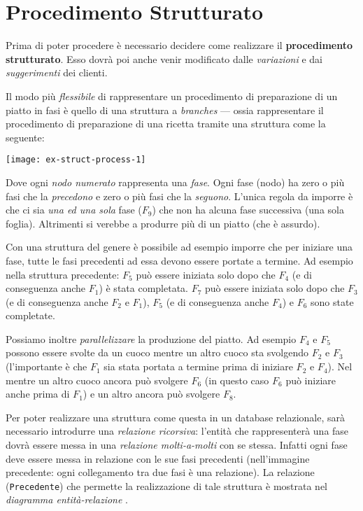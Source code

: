 \section{Procedimento Strutturato}\label{sec:structuredprocess}
Prima di poter procedere è necessario decidere come realizzare il {\bf procedimento strutturato}.
Esso dovrà poi anche venir modificato dalle {\it variazioni} e dai {\it suggerimenti} dei clienti.

Il modo più {\it flessibile} di rappresentare un procedimento di preparazione di un piatto
in fasi è quello di una struttura a {\it branches} --- ossia rappresentare il procedimento
di preparazione di una ricetta tramite una struttura come la seguente:

\vspace{5pt}\centerline{\texttt{[image: ex-struct-process-1]}}

\vspace{15pt}

Dove ogni {\it nodo numerato} rappresenta una {\it fase}. Ogni fase (nodo) ha zero o più fasi
che la {\it precedono} e zero o più fasi che la {\it seguono}. L'unica regola da imporre
è che ci sia {\it una ed una sola} fase ($F_{9}$) che non ha alcuna fase successiva (una sola
foglia). Altrimenti si verebbe a produrre più di un piatto (che è assurdo).

Con una struttura del genere è possibile ad esempio imporre che per iniziare una fase,
tutte le fasi precedenti ad essa devono essere portate a termine. Ad esempio nella struttura precedente:
$F_{5}$ può essere iniziata solo dopo che $F_{4}$ (e di conseguenza anche $F_{1}$) è stata completata.
$F_{7}$ può essere iniziata solo dopo che $F_{3}$ (e di conseguenza anche $F_{2}$ e $F_{1}$),
$F_{5}$ (e di conseguenza anche $F_{4}$) e $F_{6}$ sono state completate.

Possiamo inoltre {\it parallelizzare} la produzione del piatto. Ad esempio $F_{4}$ e $F_{5}$ possono essere
svolte da un cuoco mentre un altro cuoco sta svolgendo $F_{2}$ e $F_{3}$ (l'importante è che
$F_{1}$ sia stata portata a termine prima di iniziare $F_{2}$ e $F_{4}$). Nel mentre un altro
cuoco ancora può svolgere $F_{6}$ (in questo caso $F_{6}$ può iniziare anche prima di $F_{1}$)
e un altro ancora può svolgere $F_{8}$.

Per poter realizzare una struttura come questa in un database relazionale, sarà necessario
introdurre una {\it relazione ricorsiva}: l'entità che rappresenterà una fase dovrà essere
messa in una {\it relazione molti-a-molti} con se stessa. Infatti ogni fase deve essere
messa in relazione con le sue fasi precedenti (nell'immagine precedente: ogni collegamento
tra due fasi è una relazione).
La relazione ({\tt Precedente}) che permette la realizzazione di tale struttura è mostrata
nel {\it diagramma entità-relazione} .

